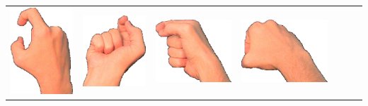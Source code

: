 \documentclass{article}
\begin{document}
\begin{center}
\begin{tabular}{r*{6}{c}}
\includegraphics[scale=0.1]{images/09-09-3.jpg}&
\includegraphics[scale=0.1]{images/09-09-4.jpg}&
\includegraphics[scale=0.1]{images/09-09-5.jpg}&
\includegraphics[scale=0.1]{images/09-09-6.jpg}\\

\end{tabular}
\end{center}
\end{document}
